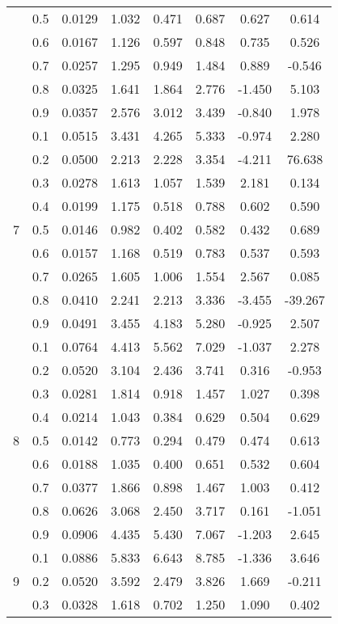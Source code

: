 \documentclass[11pt,a4paper]{report}
\begin{document}
\begin{longtable}{ | c | c || c | c | c | c | c | c | }
 & 0.5 & 0.0129 & 1.032 & 0.471 & 0.687 & 0.627 & 0.614 \\
 & 0.6 & 0.0167 & 1.126 & 0.597 & 0.848 & 0.735 & 0.526 \\
 & 0.7 & 0.0257 & 1.295 & 0.949 & 1.484 & 0.889 & -0.546 \\
 & 0.8 & 0.0325 & 1.641 & 1.864 & 2.776 & -1.450 & 5.103 \\
 & 0.9 & 0.0357 & 2.576 & 3.012 & 3.439 & -0.840 & 1.978 \\
 \hline
\multirow{9}{*}{7} & 0.1 & 0.0515 & 3.431 & 4.265 & 5.333 & -0.974 & 2.280 \\
 & 0.2 & 0.0500 & 2.213 & 2.228 & 3.354 & -4.211 & 76.638 \\
 & 0.3 & 0.0278 & 1.613 & 1.057 & 1.539 & 2.181 & 0.134 \\
 & 0.4 & 0.0199 & 1.175 & 0.518 & 0.788 & 0.602 & 0.590 \\
 & 0.5 & 0.0146 & 0.982 & 0.402 & 0.582 & 0.432 & 0.689 \\
 & 0.6 & 0.0157 & 1.168 & 0.519 & 0.783 & 0.537 & 0.593 \\
 & 0.7 & 0.0265 & 1.605 & 1.006 & 1.554 & 2.567 & 0.085 \\
 & 0.8 & 0.0410 & 2.241 & 2.213 & 3.336 & -3.455 & -39.267 \\
 & 0.9 & 0.0491 & 3.455 & 4.183 & 5.280 & -0.925 & 2.507 \\
 \hline
\multirow{9}{*}{8} & 0.1 & 0.0764 & 4.413 & 5.562 & 7.029 & -1.037 & 2.278 \\
 & 0.2 & 0.0520 & 3.104 & 2.436 & 3.741 & 0.316 & -0.953 \\
 & 0.3 & 0.0281 & 1.814 & 0.918 & 1.457 & 1.027 & 0.398 \\
 & 0.4 & 0.0214 & 1.043 & 0.384 & 0.629 & 0.504 & 0.629 \\
 & 0.5 & 0.0142 & 0.773 & 0.294 & 0.479 & 0.474 & 0.613 \\
 & 0.6 & 0.0188 & 1.035 & 0.400 & 0.651 & 0.532 & 0.604 \\
 & 0.7 & 0.0377 & 1.866 & 0.898 & 1.467 & 1.003 & 0.412 \\
 & 0.8 & 0.0626 & 3.068 & 2.450 & 3.717 & 0.161 & -1.051 \\
 & 0.9 & 0.0906 & 4.435 & 5.430 & 7.067 & -1.203 & 2.645 \\
 \hline
\multirow{9}{*}{9} & 0.1 & 0.0886 & 5.833 & 6.643 & 8.785 & -1.336 & 3.646 \\
 & 0.2 & 0.0520 & 3.592 & 2.479 & 3.826 & 1.669 & -0.211 \\
 & 0.3 & 0.0328 & 1.618 & 0.702 & 1.250 & 1.090 & 0.402 \\

\end{longtable}
\end{document}
